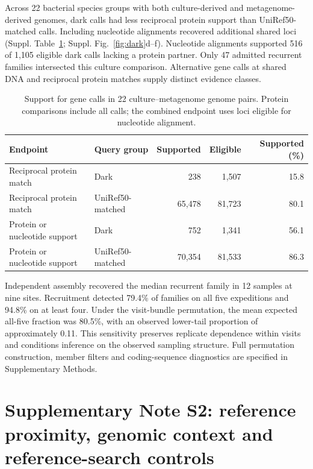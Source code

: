 Across 22 bacterial species groups with both culture-derived and metagenome-derived genomes, dark calls had less reciprocal protein support than UniRef50-matched calls. Including nucleotide alignments recovered additional shared loci (Suppl. Table~\ref{tab:culture}; Suppl. Fig.~\ref{fig:dark}d--f). Nucleotide alignments supported 516 of 1,105 eligible dark calls lacking a protein partner. Only 47 admitted recurrent families intersected this culture comparison. Alternative gene calls at shared DNA and reciprocal protein matches supply distinct evidence classes.

\begin{table}[ht]\centering\small
\caption{Support for gene calls in 22 culture--metagenome genome pairs. Protein comparisons include all calls; the combined endpoint uses loci eligible for nucleotide alignment.}\label{tab:culture}
\begin{tabular}{llrrr}\toprule
Endpoint & Query group & Supported & Eligible & Supported (\%)\\\midrule
Reciprocal protein match & Dark & 238 & 1,507 & 15.8\\
Reciprocal protein match & UniRef50-matched & 65,478 & 81,723 & 80.1\\
Protein or nucleotide support & Dark & 752 & 1,341 & 56.1\\
Protein or nucleotide support & UniRef50-matched & 70,354 & 81,533 & 86.3\\\bottomrule
\end{tabular}
\end{table}

Independent assembly recovered the median recurrent family in 12 samples at nine sites. Recruitment detected 79.4\% of families on all five expeditions and 94.8\% on at least four. Under the visit-bundle permutation, the mean expected all-five fraction was 80.5\%, with an observed lower-tail proportion of approximately 0.11. This sensitivity preserves replicate dependence within visits and conditions inference on the observed sampling structure. Full permutation construction, member filters and coding-sequence diagnostics are specified in Supplementary Methods.



\section*{Supplementary Note S2: reference proximity, genomic context and reference-search controls}

